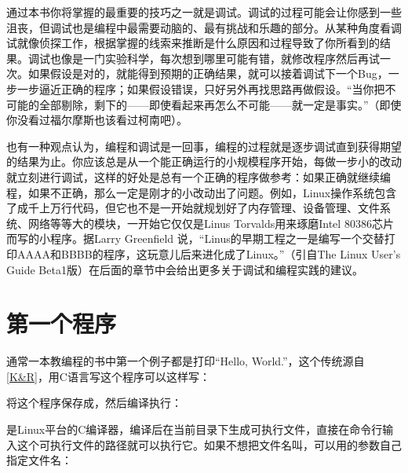 通过本书你将掌握的最重要的技巧之一就是调试。调试的过程可能会让你感到一些沮丧，但调试也是编程中最需要动脑的、最有挑战和乐趣的部分。从某种角度看调试就像侦探工作，根据掌握的线索来推断是什么原因和过程导致了你所看到的结果。调试也像是一门实验科学，每次想到哪里可能有错，就修改程序然后再试一次。如果假设是对的，就能得到预期的正确结果，就可以接着调试下一个Bug，一步一步逼近正确的程序；如果假设错误，只好另外再找思路再做假设。“当你把不可能的全部剔除，剩下的——即使看起来再怎么不可能——就一定是事实。”（即使你没看过福尔摩斯也该看过柯南吧）。



也有一种观点认为，编程和调试是一回事，编程的过程就是逐步调试直到获得期望的结果为止。你应该总是从一个能正确运行的小规模程序开始，每做一步小的改动就立刻进行调试，这样的好处是总有一个正确的程序做参考：如果正确就继续编程，如果不正确，那么一定是刚才的小改动出了问题。例如，Linux操作系统包含了成千上万行代码，但它也不是一开始就规划好了内存管理、设备管理、文件系统、网络等等大的模块，一开始它仅仅是Linus Torvalds用来琢磨Intel 80386芯片而写的小程序。据Larry Greenfield 说，“Linus的早期工程之一是编写一个交替打印AAAA和BBBB的程序，这玩意儿后来进化成了Linux。”（引自The Linux User's Guide Beta1版）在后面的章节中会给出更多关于调试和编程实践的建议。




\section{第一个程序}
%
通常一本教编程的书中第一个例子都是打印“Hello, World.\BookSplit{}”，这个传统源自\hyperlink{db.bi01.bibli.kr}{[K\&R]}，用C语言写这个程序可以这样写：





将这个程序保存成，然后编译执行：




是Linux平台的C编译器，编译后在当前目录下生成可执行文件，直接在命令行输入这个可执行文件的路径就可以执行它。如果不想把文件名叫，可以用的参数自己指定文件名：


